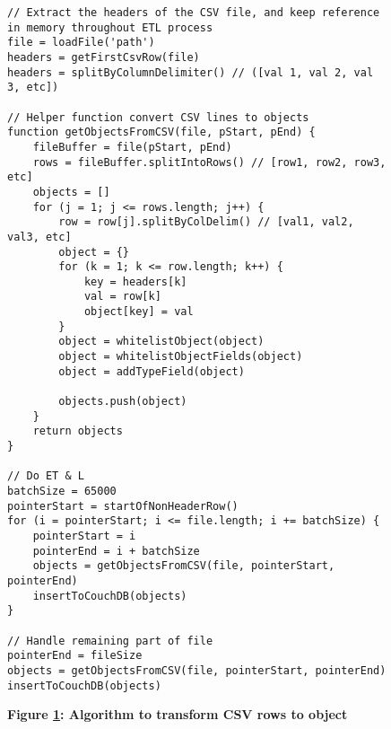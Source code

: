 
\begin{figure}[H]
    \centering
    \begin{mdframed}
        \centering
        \begin{verbatim}
// Extract the headers of the CSV file, and keep reference in memory throughout ETL process
file = loadFile('path')
headers = getFirstCsvRow(file)
headers = splitByColumnDelimiter() // ([val 1, val 2, val 3, etc])

// Helper function convert CSV lines to objects
function getObjectsFromCSV(file, pStart, pEnd) {
    fileBuffer = file(pStart, pEnd)
    rows = fileBuffer.splitIntoRows() // [row1, row2, row3, etc]
    objects = []
    for (j = 1; j <= rows.length; j++) {
        row = row[j].splitByColDelim() // [val1, val2, val3, etc]
        object = {}
        for (k = 1; k <= row.length; k++) {
            key = headers[k]
            val = row[k]
            object[key] = val
        }
        object = whitelistObject(object)
        object = whitelistObjectFields(object)
        object = addTypeField(object)

        objects.push(object)
    }
    return objects
}

// Do ET & L
batchSize = 65000
pointerStart = startOfNonHeaderRow()
for (i = pointerStart; i <= file.length; i += batchSize) {
    pointerStart = i
    pointerEnd = i + batchSize
    objects = getObjectsFromCSV(file, pointerStart, pointerEnd)
    insertToCouchDB(objects)
}

// Handle remaining part of file
pointerEnd = fileSize
objects = getObjectsFromCSV(file, pointerStart, pointerEnd)
insertToCouchDB(objects)
        \end{verbatim}
    \end{mdframed}
    \caption[Row to object transformation]{\textbf{Figure \ref{row-object-transformation}: Algorithm to transform CSV rows to object}}
    \label{row-object-transformation}
\end{figure}